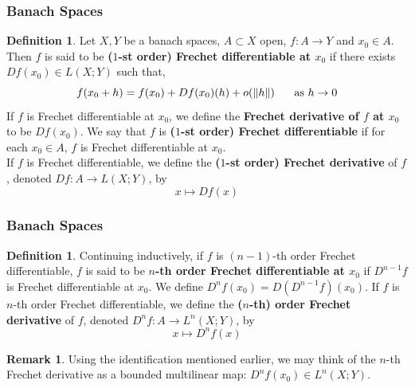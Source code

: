 \documentclass[notheorems]{beamer}
\theoremstyle{definition}
\newtheorem{defn}[definition]{Definition}
\newtheorem{rem}[definition]{Remark}
\begin{document}
\begin{frame}
	\frametitle{Banach Spaces}
	

	\begin{defn}
	Let $X, Y$ be a banach spaces, $A \subset X$ open, $f:A \rightarrow Y$ and $x_0 \in A$. Then $f$ is said to be \textbf{\textbf{($1$-st order) Frechet differentiable} at $x_0$} if there exists $Df(x_0) \in L(X;Y)$ such that, $$f(x_0 + h) = f(x_0) + Df(x_0)(h) + o(\|h\| ) \hspace{.5cm} \text{ as } h \rightarrow 0$$  
	If $f$ is Frechet differentiable at $x_0$, we define the \textbf{Frechet derivative of $f$ at $x_0$} to be $Df(x_0)$.
	We say that $f$ is \textbf{($1$-st order) Frechet differentiable} if for each $x_0 \in A$, $f$ is Frechet differentiable at $x_0$. \\
	If $f$ is Frechet differentiable, we define the \textbf{($1$-st order) Frechet derivative} of $f$, denoted $Df: A \rightarrow L(X;Y)$, by $$x \mapsto Df(x)$$
	
	\end{defn}

\end{frame}































\begin{frame}
\frametitle{Banach Spaces}


\begin{defn}
Continuing inductively, if $f$ is $(n-1)$-th order Frechet differentiable, $f$ is said to be \textbf{$n$-th order Frechet differentiable at $x_0$} if $D^{n-1}f$ is Frechet differentiable at $x_0$. We define $D^nf(x_0) = D(D^{n-1}f)(x_0)$.
If $f$ is $n$-th order Frechet differentiable, we define the \textbf{($n$-th) order Frechet derivative} of $f$, denoted $D^nf: A \rightarrow L^n(X;Y)$, by $$x \mapsto D^nf(x)$$
\end{defn}

\begin{rem}
Using the identification mentioned earlier, we may think of the $n$-th Frechet derivative as a bounded multilinear map:  $D^nf(x_0) \in L^n(X;Y)$. 
\end{rem}


\end{frame}
\end{document}
